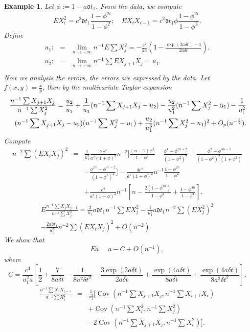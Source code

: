 \documentclass[12pt,reqno, a4paper]{article}
\newtheorem{example}[theorem]{Example}
\numberwithin{equation}{section}
\begin{document}
\begin{example}
Let $\phi:=1+a\mathfrak{d} t_1$.
From the data, we compute $$EX_i^2=c^2\mathfrak{d} t_1\frac {1-\phi^{2i}}{1-\phi^2};\quad EX_iX_{i-1}=c^2\mathfrak{d} t_1\phi\frac {1-\phi^{2i}}{1-\phi^2}.$$ Define \ \begin{eqnarray*}
u_1:&=&\lim_{n\to+\infty}n^{-1}E\sum X_j^2=-\frac {c^2}{2a}(1-\frac {\exp(2a \delta t)-1}{2a\delta t}).\\
 u_2:&=&\lim_{n\to+\infty}n^{-1}\sum E X_{j+1}X_j=u_1.\\
\end{eqnarray*}
 Now we analysis the errors, the errors are expressed by the data.  Let $f(x,y)=\frac x y$,  then by the multivariate Taylor expansion
 \begin{eqnarray*}\label{a1}
\frac {n^{-1}\sum X_{j+1}X_j} {n^{-1}\sum X_j^2}=\frac {u_2}{u_1}+\frac 1 {u_1}(n^{-1} \sum X_{j+1}X_j-u_2)-\frac {u_2}{u_1^2}(n^{-1} \sum X_j^2-u_1) -\frac 1 {u_1^2}\nonumber\\ \quad( n^{-1}\sum X_{j+1}X_j-u_2)(n^{-1} \sum X_j^2-u_1)+\frac {u_2} {u_1^3}(n^{-1}\sum  X_j^2-u_1)^2+O_p(n^{-\frac 3 2}).\newline
\end{eqnarray*}
Compute \begin{eqnarray*}
n^{-2}\sum( EX_iX_j)^2&=&\frac 1 {u_1^2}\frac {2c^4}{a^2(1+\phi)^2}n^{-2}[\frac {(n-1)\phi^2}{1-\phi^2}-\frac {\phi^4-\phi^{2n+2}}{(1-\phi^2)^2}+\frac {\phi^2-\phi^{4n-2}}{(1-\phi^2)^2(1+\phi^2)}\\
&&-\frac {\phi^{2n}-\phi^{4n-2}}{(1-\phi^2)^2}]-\frac {4c^4}{a^2(1+\phi)^2}n^{-1}\frac {1-\phi^{2n}}{1-\phi^2}\\&&+\frac {c^4}{a^2(1+\phi)^2}n^{-1}[n-\frac {2(1-\phi^{2n})}{1-\phi^2}+\frac {1-\phi^{4n}}{1-\phi^4}].
\end{eqnarray*}
\begin{eqnarray*}E\frac {n^{-1} {\sum X_jX_{j-1}}}{n^{-1} \sum X_j^2}=\frac 2 {u_1}a\mathfrak{d} t_1n^{-1}\sum EX_j^2-\frac 1 {u_1^2}a\mathfrak{d} t_1n^{-2}\sum (EX_j^2)^2\\-\frac {2a\mathfrak{d}t_1} {u_1^2}n^{-2}\sum( EX_iX_j)^2+O(n^{-2}).\end{eqnarray*}
 We show that
 $$E\hat{a}=a-C+O(n^{-1}),$$
 where $$C=\frac {c^4}{u_1^2a}\left [\frac 1 2 +\frac 7 {8a \delta t}-\frac 1 {8a^2\delta t^2}-\frac {3\exp(2a\delta t)}{2a\delta t}+\frac {\exp(4a\delta t)}{8a\delta t}+\frac {\exp(4a\delta t)}{8a^2\delta t^2}\right].$$
 \begin{eqnarray*}
\frac {n^{-1} {\sum X_jX_{j-1}}}{n^{-1} \sum X_j^2}&=&\frac 1 {u_1^2} \bigg [ {\operatorname{Cov}(n^{-1}\sum X_{j+1}X_j, n^{-1}\sum X_{i+1}X_i)}\\&&+\operatorname{Cov}(n^{-1}\sum X_i^2,n^{-1}\sum X_j^2)\\&&-2\operatorname{Cov}(n^{-1}\sum X_{j+1}X_j, n^{-1}\sum X_i^2)\bigg ].\end{eqnarray*}

\end{example}
\end{document}
